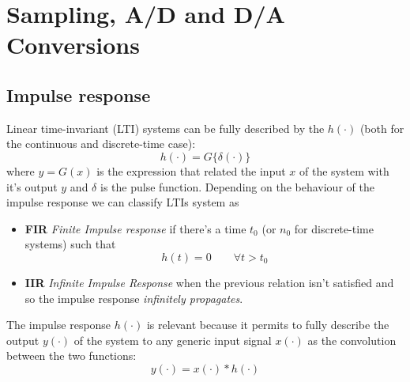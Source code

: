 \chapter{Sampling, A/D and D/A Conversions}
\section{Impulse response} \label{sec:conv:impulseresponse}
	
	Linear time-invariant (LTI) systems can be fully described by the  $h(\cdot)$ (both for the continuous and discrete-time case):
	\begin{equation}
		h(\cdot) = G\{ \delta(\cdot) \}
	\end{equation}
	where $y=G(x)$ is the expression that related the input $x$ of the system with it's output $y$ and $\delta$ is the pulse function. Depending  on the behaviour of the impulse response we can classify LTIs system as
	\begin{itemize}
		\item \textbf{FIR} \textit{Finite Impulse response} if there's a time $t_0$ (or $n_0$ for discrete-time systems) such that
		\[ h(t) = 0 \qquad \forall t > t_0 \]
		\item \textbf{IIR} \textit{Infinite Impulse Response} when the previous relation isn't satisfied and so the impulse response \textit{infinitely propagates}.
	\end{itemize}
	The impulse response $h(\cdot)$ is relevant because it permits to fully describe the output $y(\cdot)$ of the system to any generic input signal $x(\cdot)$ as the convolution between the two functions:
	\begin{equation} \label{eq:conv:imprestime}
		y(\cdot) = x(\cdot) * h(\cdot)
	\end{equation}
	
